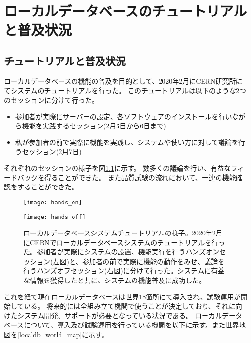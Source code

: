\chapter{ローカルデータベースのチュートリアルと普及状況} \label{cap:appA}

\section{チュートリアルと普及状況}
ローカルデータベースの機能の普及を目的として、2020年2月にCERN研究所にてシステムのチュートリアルを行った。
このチュートリアルは以下のような2つのセッションに分けて行った。

\begin{itemize}
  \item 参加者が実際にサーバーの設定、各ソフトウェアのインストールを行いながら機能を実践するセッション(2月3日から6日まで)
  \item 私が参加者の前で実際に機能を実践し、システムや使い方に対して議論を行うセッション(2月7日)
\end{itemize}

それぞれのセッションの様子を図\ref{Tutorial_picture}に示す。
数多くの議論を行い、有益なフィードバックを得ることができた。
また品質試験の流れにおいて、一連の機能確認をすることができた。

\begin{figure}[bpt]
  \begin{center}
  \begin{minipage}{0.4\hsize}
    \texttt{[image: hands\_on]}
  \end{minipage}
  \begin{minipage}{0.4\hsize}
    \texttt{[image: hands\_off]}
  \end{minipage}
  \caption[ローカルデータベースシステムチュートリアルの様子]{ローカルデータベースシステムチュートリアルの様子。2020年2月にCERNでローカルデータベースシステムのチュートリアルを行った。参加者が実際にシステムの設置、機能実行を行うハンズオンセッション(左図)と、参加者の前で実際に機能の動作をみせ、議論を行うハンズオフセッション(右図)に分けて行った。システムに有益な情報を獲得したと共に、システムの機能普及に成功した。}
  \label{Tutorial_picture}
  \end{center}
\end{figure}

これを経て現在ローカルデータベースは世界18箇所にて導入され、試験運用が開始している。
将来的には全組み立て機関で使うことが決定しており、それに向けたシステム開発、サポートが必要となっている状況である。
ローカルデータベースについて、導入及び試験運用を行っている機関を以下に示す。また世界地図を\ref{localdb_world_map}に示す。

